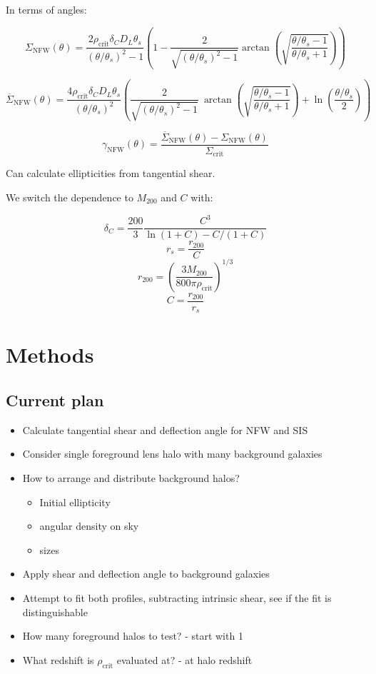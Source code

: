 \documentclass[]{article}
\begin{document}
In terms of angles:

\[\Sigma_\mathrm{NFW}(\theta) = \frac{2 \rho_\mathrm{crit} \delta_C D_L \theta_s}{(\theta/\theta_s)^2 - 1} \left(1 - \frac{2}{\sqrt{(\theta/\theta_s)^2 - 1}} \arctan\left(\sqrt{\frac{\theta/\theta_s - 1}{\theta/\theta_s + 1}} \right) \right)\]

\[\overline{\Sigma}_\mathrm{NFW}(\theta) = \frac{4 \rho_\mathrm{crit} \delta_C D_L \theta_s}{(\theta/\theta_s)^2} \left(
    \frac{2}{\sqrt{(\theta/\theta_s)^2 - 1}} ~\arctan\left(\sqrt{\frac{\theta/\theta_s - 1}{\theta/\theta_s + 1}} \right) + \ln{\left(\frac{\theta/\theta_s}{2}\right)}
\right)\]

\[\gamma_\mathrm{NFW}(\theta) = \frac{\overline{\Sigma}_\mathrm{NFW}(\theta) - \Sigma_\mathrm{NFW}(\theta)}{\Sigma_\mathrm{crit}} \]

Can calculate ellipticities from tangential shear.

We switch the dependence to $M_{200}$ and $C$ with:

\[\delta_C = \frac{200}{3} \frac{C^3}{\ln(1 + C) - C/(1 + C)}\]
\[r_s = \frac{r_{200}}{C}\]
\[r_{200} = \left( \frac{3 M_{200}}{800 \pi \rho_\mathrm{crit}} \right)^{1/3}\]
\[C = \frac{r_{200}}{r_s}\]


\section{Methods}

\subsection{Current plan}
\begin{itemize}
    \item Calculate tangential shear and deflection angle for NFW and SIS
    \item Consider single foreground lens halo with many background galaxies
    \item How to arrange and distribute background halos?
    \begin{itemize}
        \item Initial ellipticity
        \item angular density on sky
        \item sizes
    \end{itemize}
    \item Apply shear and deflection angle to background galaxies
    \item Attempt to fit both profiles, subtracting intrinsic shear, see if the fit is distinguishable
    \item How many foreground halos to test? - start with 1
    \item What redshift is $\rho_\mathrm{crit}$ evaluated at? - at halo redshift

\end{itemize}
\end{document}
